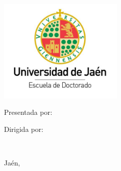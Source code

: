 \begin{center}
    \null\vspace{2mm}

    \includegraphics[width=0.45\textwidth]{images/Uja/UjaPhD.png}
    
    \vspace{5mm}
    
    {
        \libertineNormalCapital
        \huge

        \libertineNormalCapital
        \Huge 
        \textcolor{redThesis}{
        }
    }
    
    \vspace{55mm}

    \raggedleft
    {
       \libertineBoldCapital
       \Large 
       Presentada por:\\

       \vspace{2mm}
       
       \libertineNormalCapital
       \authorship
    }
    
    \vspace{5mm}

    \raggedleft
    {
       \libertineBoldCapital
       \Large 
       Dirigida por:\\

       \vspace{1mm}
    
       \libertineNormalCapital
       \mainSupervisor\\
       \minorSpacing
       \secondSupervisor
    }

    \vspace{6mm}

    \raggedleft
    {
        \libertineNormalCapital
        \Large 
        Jaén, \dateDissertationSpanish
    }
    
    \libertineNormal
    \newpage
\end{center}